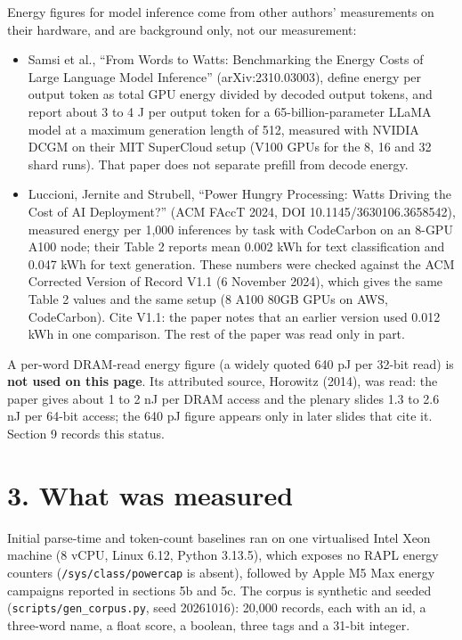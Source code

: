 \documentclass[10pt,letterpaper]{article}
\providecommand{\tightlist}{\setlength{\itemsep}{1pt}\setlength{\parskip}{0pt}}
\begin{document}
Energy figures for model inference come from other authors' measurements
on their hardware, and are background only, not our measurement:

\begin{itemize}
\tightlist
\item
  Samsi et al., ``From Words to Watts: Benchmarking the Energy Costs of
  Large Language Model Inference'' (arXiv:2310.03003), define energy per
  output token as total GPU energy divided by decoded output tokens, and
  report about 3 to 4 J per output token for a 65-billion-parameter
  LLaMA model at a maximum generation length of 512, measured with
  NVIDIA DCGM on their MIT SuperCloud setup (V100 GPUs for the 8, 16 and
  32 shard runs). That paper does not separate prefill from decode
  energy.
\item
  Luccioni, Jernite and Strubell, ``Power Hungry Processing: Watts
  Driving the Cost of AI Deployment?'' (ACM FAccT 2024, DOI
  10.1145/3630106.3658542), measured energy per 1,000 inferences by task
  with CodeCarbon on an 8-GPU A100 node; their Table 2 reports mean
  0.002 kWh for text classification and 0.047 kWh for text generation.
  These numbers were checked against the ACM Corrected Version of Record
  V1.1 (6 November 2024), which gives the same Table 2 values and the
  same setup (8 A100 80GB GPUs on AWS, CodeCarbon). Cite V1.1: the paper
  notes that an earlier version used 0.012 kWh in one comparison. The
  rest of the paper was read only in part.
\end{itemize}

A per-word DRAM-read energy figure (a widely quoted 640 pJ per 32-bit
read) is \textbf{not used on this page}. Its attributed source, Horowitz
(2014), was read: the paper gives about 1 to 2 nJ per DRAM access and
the plenary slides 1.3 to 2.6 nJ per 64-bit access; the 640 pJ figure
appears only in later slides that cite it. Section 9 records this
status.

\section{3. What was measured}\label{what-was-measured}

Initial parse-time and token-count baselines ran on one virtualised
Intel Xeon machine (8 vCPU, Linux 6.12, Python 3.13.5), which exposes no
RAPL energy counters (\texttt{/\allowbreak{}sys/\allowbreak{}class/\allowbreak{}powercap} is absent), followed
by Apple M5 Max energy campaigns reported in sections 5b and 5c. The
corpus is synthetic and seeded (\texttt{scripts/\allowbreak{}gen\_\allowbreak{}corpus.\allowbreak{}py}, seed
20261016): 20,000 records, each with an id, a three-word name, a float
score, a boolean, three tags and a 31-bit integer.
\end{document}
